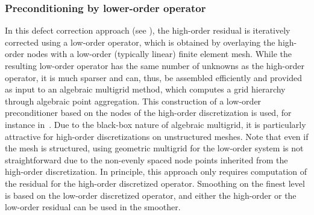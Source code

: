 \documentclass[smallcondensed,final]{svjour3}     %
\newcommand{\gsnote}[1]{\textcolor{blue}{GS: #1}}
\begin{document}
\subsubsection{Preconditioning by lower-order operator} \label{subsec:low}
In this defect correction approach (see
\cite{TrottenbergOosterleeSchuller01, Hackbusch85}), the high-order
residual is iteratively corrected using a low-order operator, which is
obtained by overlaying the high-order nodes with a low-order
(typically linear) finite element mesh. While the resulting low-order
operator has the same number of unknowns as the high-order operator,
it is much sparser and can, thus, be assembled efficiently and
provided as input to an algebraic multigrid method, which computes a
grid hierarchy through algebraic point aggregation.  This construction
of a low-order preconditioner based on the nodes of the high-order
discretization is used, for instance in~\cite{Brown10, Kim07,
  DevilleMund90, HeysManteuffelMcCormickEtAl05}. Due to the black-box
nature of algebraic multigrid, it is particularly attractive for
high-order discretizations on unstructured meshes.  Note that even if
the mesh is structured, using geometric multigrid for the low-order
system is not straightforward due to the non-evenly spaced node points
inherited from the high-order discretization.  In principle, this
approach only requires computation of the residual for the high-order
discretized operator. Smoothing on the finest level is based on the
low-order discretized operator, and either the high-order or the
low-order residual can be used in the smoother.




\end{document}
